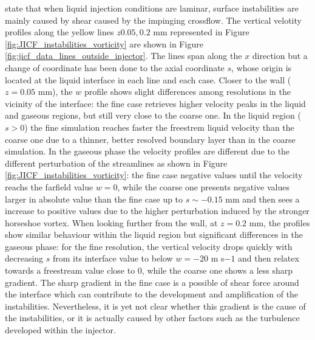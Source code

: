  state that when liquid injection conditions are laminar, surface instabilities are mainly caused by shear caused by the impinging crossflow. The vertical velotity profiles along the yellow lines $z 0.05, 0.2$ mm represented in Figure \ref{fig:JICF_instabilities_vorticity} are shown in Figure \ref{fig:jicf_data_lines_outside_injector}. The lines span along the $x$ direction but a change of coordinate has been done to the axial coordinate $s$, whose origin is located at the liquid interface in each line and each case. Closer to the wall ($z = 0.05$ mm), the $w$ profile shows slight differences among resolutions in the vicinity of the interface: the fine case retrieves higher velocity peaks in the liquid and gaseous regions, but still very close to the coarse one. In the liquid region ($s > 0$) the fine simulation reaches faster the freestrem liquid velocity than the coarse one due to a thinner, better resolved boundary layer than in the coarse simulation. In the gaseous phase the velocity profiles are different due to the different perturbation of the streamlines as shown in Figure \ref{fig:JICF_instabilities_vorticity}: the fine case negative values until the velocity reachs the farfield value $w = 0$, while the coarse one presents negative values larger in absolute value than the fine case up to $s \sim -0.15$ mm and then sees a increase to positive values due to the higher perturbation induced by the stronger horseshoe vortex. When looking further from the wall, at $z = 0.2$ mm, the profiles show similar behaviour within the liquid region but significant differences in the gaseous phase: for the fine resolution, the vertical velocity drops quickly with decreasing $s$ from its interface value to below $w = - 20$ m s${-1}$ and then relatex towards a freestream value close to 0, while the coarse one shows a less sharp gradient. The sharp gradient in the fine case is a possible of shear force around the interface which can contribute to the development and amplification of the instabilities. Nevertheless, it is yet not clear whether this gradient is the cause of the instabilities, or it is actually caused by other factors such as the turbulence developed within the injector.


